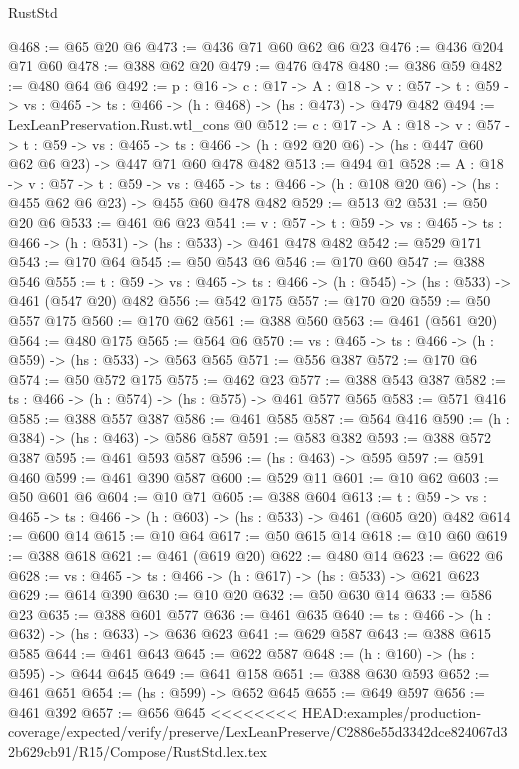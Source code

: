 \begin{lexlean}{RustStd}
\begin{coremodule}
{\begin{coremodule}
@468 := @65 @20 @6
@473 := @436 @71 @60 @62 @6 @23
@476 := @436 @204 @71 @60
@478 := @388 @62 @20
@479 := @476 @478
@480 := @386 @59
@482 := @480 @64 @6
@492 := {p : @16} ->
  {c : @17} ->
  {A : @18} ->
  {v : @57} -> {t : @59} -> {vs : @465} -> {ts : @466} -> (h : @468) -> (hs : @473) -> @479 @482
@494 := LexLeanPreservation.Rust.wtl_cons @0
@512 := {c : @17} ->
  {A : @18} ->
  {v : @57} ->
  {t : @59} ->
  {vs : @465} ->
  {ts : @466} -> (h : @92 @20 @6) -> (hs : @447 @60 @62 @6 @23) -> @447 @71 @60 @478 @482
@513 := @494 @1
@528 := {A : @18} ->
  {v : @57} ->
  {t : @59} ->
  {vs : @465} -> {ts : @466} -> (h : @108 @20 @6) -> (hs : @455 @62 @6 @23) -> @455 @60 @478 @482
@529 := @513 @2
@531 := @50 @20 @6
@533 := @461 @6 @23
@541 := {v : @57} ->
  {t : @59} -> {vs : @465} -> {ts : @466} -> (h : @531) -> (hs : @533) -> @461 @478 @482
@542 := @529 @171
@543 := @170 @64
@545 := @50 @543 @6
@546 := @170 @60
@547 := @388 @546
@555 := {t : @59} -> {vs : @465} -> {ts : @466} -> (h : @545) -> (hs : @533) -> @461 (@547 @20) @482
@556 := @542 @175
@557 := @170 @20
@559 := @50 @557 @175
@560 := @170 @62
@561 := @388 @560
@563 := @461 (@561 @20)
@564 := @480 @175
@565 := @564 @6
@570 := {vs : @465} -> {ts : @466} -> (h : @559) -> (hs : @533) -> @563 @565
@571 := @556 @387
@572 := @170 @6
@574 := @50 @572 @175
@575 := @462 @23
@577 := @388 @543 @387
@582 := {ts : @466} -> (h : @574) -> (hs : @575) -> @461 @577 @565
@583 := @571 @416
@585 := @388 @557 @387
@586 := @461 @585
@587 := @564 @416
@590 := (h : @384) -> (hs : @463) -> @586 @587
@591 := @583 @382
@593 := @388 @572 @387
@595 := @461 @593 @587
@596 := (hs : @463) -> @595
@597 := @591 @460
@599 := @461 @390 @587
@600 := @529 @11
@601 := @10 @62
@603 := @50 @601 @6
@604 := @10 @71
@605 := @388 @604
@613 := {t : @59} -> {vs : @465} -> {ts : @466} -> (h : @603) -> (hs : @533) -> @461 (@605 @20) @482
@614 := @600 @14
@615 := @10 @64
@617 := @50 @615 @14
@618 := @10 @60
@619 := @388 @618
@621 := @461 (@619 @20)
@622 := @480 @14
@623 := @622 @6
@628 := {vs : @465} -> {ts : @466} -> (h : @617) -> (hs : @533) -> @621 @623
@629 := @614 @390
@630 := @10 @20
@632 := @50 @630 @14
@633 := @586 @23
@635 := @388 @601 @577
@636 := @461 @635
@640 := {ts : @466} -> (h : @632) -> (hs : @633) -> @636 @623
@641 := @629 @587
@643 := @388 @615 @585
@644 := @461 @643
@645 := @622 @587
@648 := (h : @160) -> (hs : @595) -> @644 @645
@649 := @641 @158
@651 := @388 @630 @593
@652 := @461 @651
@654 := (hs : @599) -> @652 @645
@655 := @649 @597
@656 := @461 @392
@657 := @656 @645
<<<<<<<< HEAD:examples/production-coverage/expected/verify/preserve/LexLeanPreserve/C2886e55d3342dce824067d32b629cb91/R15/Compose/RustStd.lex.tex

\end{coremodule}}
\end{coremodule}
\end{lexlean}
